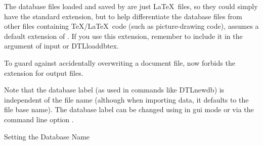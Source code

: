 The  database files loaded and saved by 
are just \LaTeX\ files, so they could simply have the standard
 extension, but to help differentiate the database files
from other files containing \TeX\slash \LaTeX\ code (such as picture-drawing
code),  assumes a default extension of .
If you use this extension, remember to include it in the argument of
\gls{input} or \gls{DTLloaddbtex}.

\begin{information}
To guard against accidentally overwriting a document file, 
now forbids the  extension for output files.
\end{information}

Note that the database label (as used in commands like \gls{DTLnewdb})
is independent of the file name (although when importing data, it defaults 
to the file base name).  The database label can be changed using 
 in 
\gls{gui} mode or via the command line option 
.

{
}
{Setting the Database Name}

